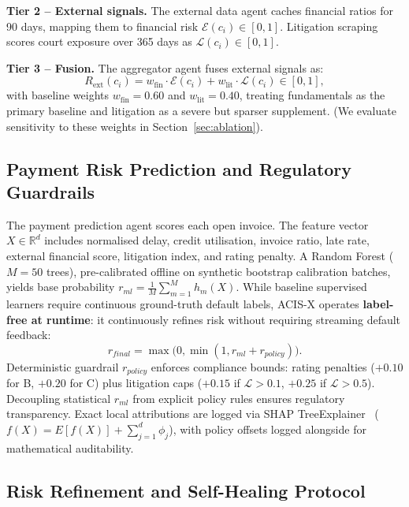 \documentclass[runningheads]{llncs}
\begin{document}
\textbf{Tier 2 -- External signals.} The external data agent caches financial ratios for 90 days, mapping them to financial risk $\mathcal{E}(c_i)\in[0,1]$. Litigation scraping scores court exposure over 365 days as $\mathcal{L}(c_i)\in[0,1]$.

\textbf{Tier 3 -- Fusion.} The aggregator agent fuses external signals as:
\begin{equation}
R_{\text{ext}}(c_i) = w_{\text{fin}}\cdot\mathcal{E}(c_i) + w_{\text{lit}}\cdot\mathcal{L}(c_i)\in[0,1],
\label{eq:aggregation}
\end{equation}
with baseline weights $w_{\text{fin}}=0.60$ and $w_{\text{lit}}=0.40$, treating fundamentals as the primary baseline and litigation as a severe but sparser supplement. (We evaluate sensitivity to these weights in Section~\ref{sec:ablation}).

\subsection{Payment Risk Prediction and Regulatory Guardrails}
The payment prediction agent scores each open invoice. The feature vector $X\in\mathbb{R}^{d}$ includes normalised delay, credit utilisation, invoice ratio, late rate, external financial score, litigation index, and rating penalty. A Random Forest ($M=50$ trees), pre-calibrated offline on synthetic bootstrap calibration batches, yields base probability $r_{ml}=\frac{1}{M}\sum_{m=1}^{M} h_m(X)$. While baseline supervised learners require continuous ground-truth default labels, ACIS-X operates \textbf{label-free at runtime}: it continuously refines risk without requiring streaming default feedback:
\begin{equation}
r_{final}=\max\bigl(0,\min(1,r_{ml}+r_{policy})\bigr).
\label{eq:prediction}
\end{equation}
Deterministic guardrail $r_{policy}$ enforces compliance bounds: rating penalties ($+0.10$ for B, $+0.20$ for C) plus litigation caps ($+0.15$ if $\mathcal{L}>0.1$, $+0.25$ if $\mathcal{L}>0.5$). Decoupling statistical $r_{ml}$ from explicit policy rules ensures regulatory transparency. Exact local attributions are logged via SHAP TreeExplainer~\cite{lundberg2020local} ($f(X)=E[f(X)]+\sum_{j=1}^{d}\phi_j$), with policy offsets logged alongside for mathematical auditability.


\subsection{Risk Refinement and Self-Healing Protocol}
\end{document}
